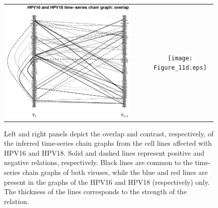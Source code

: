 \begin{figure}[h!]
\centering
\begin{tabular}{cccc}
\includegraphics[scale=0.47]{Figure_11c.eps} & & &
\texttt{[image: Figure\_11d.eps]}
\end{tabular}
\caption{Left and right panels depict the overlap and contrast, respectively, of the inferred time-series chain graphs from the cell lines affected with HPV16 and HPV18. Solid and dashed lines represent positive and negative relations, respectively. Black lines are common to the time-series chain graphs of both viruses, while the  blue and red lines are present in the graphs of the HPV16 and HPV18 (respectively) only. The thickness of the lines corresponds to the strength of the relation.}
\label{fig:VARmultipleEst}
\end{figure}


